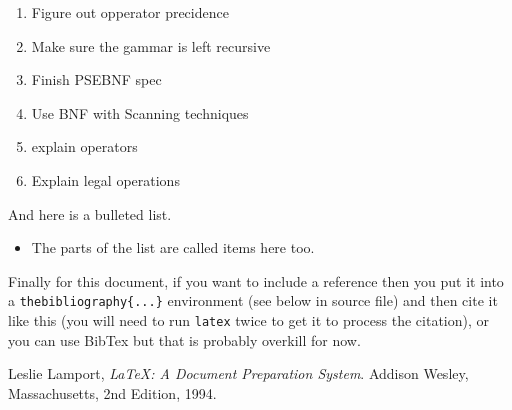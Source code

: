 \documentclass[a4wide, 11pt]{article}
\begin{document}
\begin{enumerate}

    \item
    Figure out opperator precidence
    
    \item
    Make sure the gammar is left recursive
    
    \item
    Finish PSEBNF spec

    \item
    Use BNF with Scanning techniques 
    
    \item
     explain operators

    \item
    Explain legal operations    
    
    
\end{enumerate}

And here is a bulleted list.

\begin{itemize}

    \item
    The parts of the list are called items here too.
    
\end{itemize}

Finally for this document, if you want to include a reference
then you put it into a \texttt{thebibliography\{...\}}
environment (see below in source file) and then 
cite it like this \cite{lamport94}
(you will need to run \texttt{latex} twice to get it to process the citation),
or you can use BibTex but that is probably overkill for now.

\begin{thebibliography}{9}

  Leslie Lamport,
  \emph{\LaTeX: A Document Preparation System}.
  Addison Wesley, Massachusetts,
  2nd Edition,
  1994.

\end{thebibliography}
\end{document}
